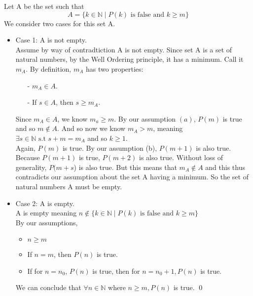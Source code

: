 \documentclass{article}
\begin{document}
\begin{enumerate}
        Let A be the set such that
        \begin{equation}
            A = \{k \in \mathbb{N} \mid P(k) \text{ is false and } k \ge m\}
        \end{equation}
        We consider two cases for this set A.
        \begin{itemize}
            \item Case 1: A is not empty.\\
                Assume by way of contradtiction A is not empty. Since set A is a set of natural numbers, by the Well Ordering principle, it has a minimum. Call it $m_A$.
                By definition, $m_A$ has two properties:
                \begin{itemize}
                    \item[-] $m_A \in A$.
                    \item[-] If $s \in A$, then $s \ge m_A.$
                \end{itemize}
                Since $m_A \in A$, we know $m_a \ge m$. By our assumption $(a)$, $P(m)$ is true and so $m \notin A$.
                And so now we know $m_A > m$, meaning $\exists s \in \mathbb{N} \text{ s.t } s + m = m_A$ and so $k \ge 1$.\\
                Again, $P(m)$ is true. By our assumption (b), $P(m+1)$ is also true.\\
                Because $P(m+1)$ is true, $P(m+2)$ is also true.
                Without loss of generality, $P(m+s$) is also true. But this means that $m_A \notin A$ and this thus contradicts our assumption about the set A having a minimum. So the set of natural numbers A must be empty.
            \item Case 2: A is empty.\\
                A is empty meaning $n \notin \{k \in \mathbb{N} \mid P(k) \text { is false and } k \ge m\}$\\
                By our assumptions,
                \begin{itemize}
                    \item $n \ge m$
                    \item If $n = m$, then $P(n)$ is true.
                    \item If for $n = n_0$, $P(n)$ is true, then for $n = n_0 + 1, P(n)$ is true.\\
                \end{itemize}
                We can conclude that $\forall n \in \mathbb{N}$ where $n \ge m, P(n)$ is true. \qed
        \end{itemize}


\end{enumerate}
\end{document}
